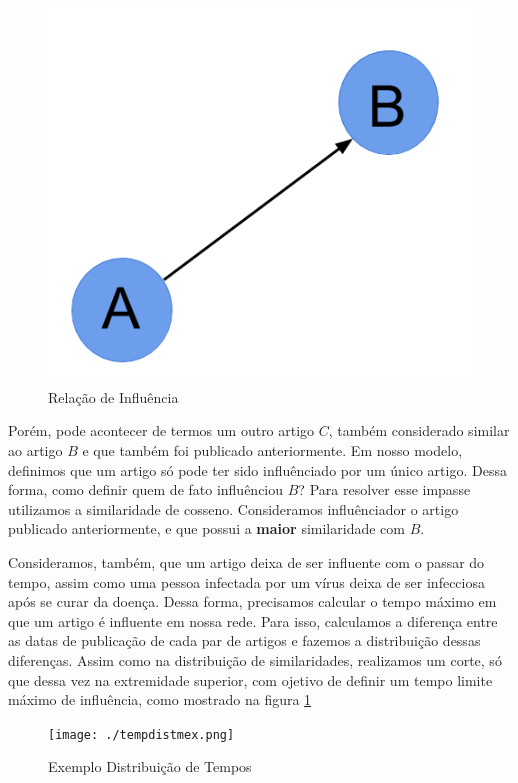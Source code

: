\documentclass[a4paper,12pt]{article}
\begin{document}
\begin{description}
    \vspace{0.5cm}
    \begin{figure}[h]
      \centering
      \includegraphics[scale=0.2]{./rede2.png}
      \caption{Relação de Influência}
    \end{figure}
    
    \pagebreak

    Porém, pode acontecer de termos um outro artigo $C$, também considerado similar ao artigo $B$ e que também foi publicado anteriormente. Em nosso modelo,
    definimos que um artigo só pode ter sido influênciado por um único artigo. Dessa forma, como definir quem de fato influênciou $B$? Para
    resolver esse impasse utilizamos a similaridade de cosseno. Consideramos influênciador o artigo publicado anteriormente, e que possui
    a \textbf{maior} similaridade com $B$.
    
    Consideramos, também, que um artigo deixa de ser influente com o passar do tempo, assim como uma pessoa infectada por um vírus deixa
    de ser infecciosa após se curar da doença. Dessa forma, precisamos calcular o tempo máximo em que um artigo é influente em nossa rede.
    Para isso, calculamos a diferença entre as datas de publicação de cada par de artigos e fazemos a distribuição dessas diferenças. Assim como
    na distribuição de similaridades, realizamos um corte, só que dessa vez na extremidade superior, com ojetivo de definir um tempo limite
    máximo de influência, como mostrado na figura \ref{fig:4}
    
    \vspace{0.4cm}
    \begin{figure}[h]
      \label{fig:4}
      \centering
      \texttt{[image: ./tempdistmex.png]}
      \caption{Exemplo Distribuição de Tempos}
    \end{figure}

    
    
 \end{description}
\end{document}
